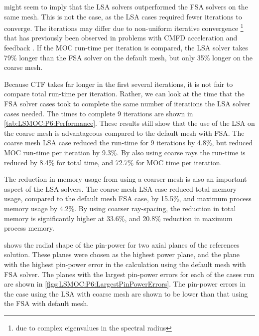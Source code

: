 {{{       might seem to imply that the \ac{LSA} solvers outperformed the \ac{FSA} solvers on the same mesh.
      This is not the case, as the \ac{LSA} cases required fewer iterations to converge.
      The iterations may differ due to non-uniform iterative convergence \footnote{due to complex eigenvalues in the spectral radius} that has previously been observed in problems with \ac{CMFD} acceleration and feedback \cite{Kochunas2017}.
      If the \ac{MOC} run-time per iteration is compared, the \ac{LSA} solver takes 79\% longer than the \ac{FSA} solver on the default mesh, but only 35\% longer on the coarse mesh.

      Because \ac{CTF} takes far longer in the first several iterations, it is not fair to compare total run-time per iteration.
      Rather, we can look at the time that the \ac{FSA} solver cases took to complete the same number of iterations the \ac{LSA} solver cases needed.
      The times to complete 9 iterations are shown in \cref{tab:LSMOC:P6:Performance}.
      These results still show that the use of the \ac{LSA} on the coarse mesh is advantageous compared to the default mesh with \ac{FSA}.
      The coarse mesh \ac{LSA} case reduced the run-time for 9 iterations by 4.8\%, but reduced \ac{MOC} run-time per iteration by 9.3\%.
      By also using coarse rays the run-time is reduced by 8.4\% for total time, and 72.7\% for \ac{MOC} time per iteration.

      The reduction in memory usage from using a coarser mesh is also an important aspect of the \ac{LSA} solvers.
      The coarse mesh \ac{LSA} case reduced total memory usage, compared to the default mesh \ac{FSA} case, by 15.5\%, and maximum process memory usage by 4.2\%.
      By using coarser ray-spacing, the reduction in total memory is significantly higher at 33.6\%, and 20.8\% reduction in maximum process memory.

       shows the radial shape of the pin-power for two axial planes of the references solution.
      These planes were chosen as the highest power plane, and the plane with the highest pin-power error in the calculation using the default mesh with \ac{FSA} solver.
      The planes with the largest pin-power errors for each of the cases run are shown in \cref{figs:LSMOC:P6:LargestPinPowerErrors}.
      The pin-power errors in the case using the \ac{LSA} with coarse mesh are shown to be lower than that using the \ac{FSA} with default mesh.

}}}
